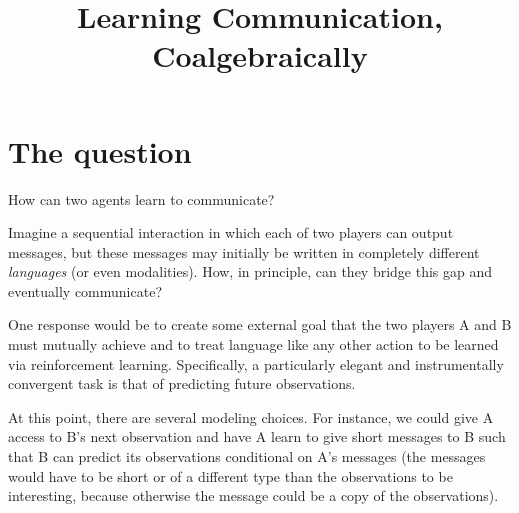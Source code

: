 \documentclass{article}
\title{Learning Communication, Coalgebraically}
\author{}
\date{}
\theoremstyle{definition}
\begin{document}
\maketitle

\section{The question}

How can two agents learn to communicate?

Imagine a sequential interaction in which each of two players can output messages, but these messages may initially be written in completely different \emph{languages} (or even modalities).
How, in principle, can they bridge this gap and eventually communicate?

One response would be to create some external goal that the two players A and B must mutually achieve and to treat language like any other action to be learned via reinforcement learning. Specifically, a particularly elegant and instrumentally convergent task is that of predicting future observations.

At this point, there are several modeling choices.
For instance, we could give A access to B's next observation and have A learn to give short messages to B such that B can predict its observations conditional on A's messages (the messages would have to be short or of a different type than the observations to be interesting, because otherwise the message could be a copy of the observations).
\end{document}
